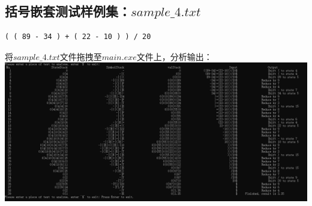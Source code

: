 \documentclass[UTF8]{ctexart}
\begin{document}
\subsection{括号嵌套测试样例集：$sample\_4.txt$}
\begin{lstlisting}
( ( 89 - 34 ) + ( 22 - 10 ) ) / 20

    \end{lstlisting}
将$sample\_4.txt$文件拖拽至$main.exe$文件上，分析输出： \\
\includegraphics[width=\textwidth]{sample_4}
\end{document}

